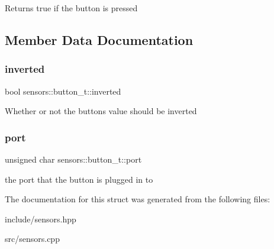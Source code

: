 Returns true if the button is pressed 

\subsection{Member Data Documentation}
\mbox{\label{structsensors_1_1button__t_a9d219ff98b6f74e5f4fcbd987f419484}} 
\subsubsection{\texorpdfstring{inverted}{inverted}}
{\footnotesize\ttfamily bool sensors\+::button\+\_\+t\+::inverted}

Whether or not the button\textquotesingle{}s value should be inverted \mbox{\label{structsensors_1_1button__t_ad100f6e3b4333b9271e597d940e18852}} 
\subsubsection{\texorpdfstring{port}{port}}
{\footnotesize\ttfamily unsigned char sensors\+::button\+\_\+t\+::port}

the port that the button is plugged in to 

The documentation for this struct was generated from the following files\+:\begin{DoxyCompactItemize}
\item 
include/sensors.\+hpp\item 
src/sensors.\+cpp\end{DoxyCompactItemize}
